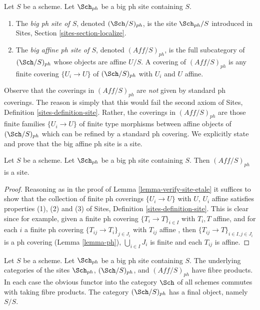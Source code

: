 \begin{definition}
\label{definition-big-small-ph}
Let $S$ be a scheme. Let $\Sch_{ph}$ be a big ph site containing $S$.
\begin{enumerate}
\item The {\it big ph site of $S$}, denoted
$(\Sch/S)_{ph}$, is the site $\Sch_{ph}/S$
introduced in Sites, Section \ref{sites-section-localize}.
\item The {\it big affine ph site of $S$}, denoted
$(\textit{Aff}/S)_{ph}$, is the full subcategory of
$(\Sch/S)_{ph}$ whose objects are affine $U/S$.
A covering of $(\textit{Aff}/S)_{ph}$ is any finite covering
$\{U_i \to U\}$ of $(\Sch/S)_{ph}$ with $U_i$ and $U$ affine.
\end{enumerate}
\end{definition}

\noindent
Observe that the coverings in $(\textit{Aff}/S)_{ph}$ are {\it not}
given by standard ph coverings. The reason is simply that this would
fail the second axiom of Sites, Definition \ref{sites-definition-site}.
Rather, the coverings in $(\textit{Aff}/S)_{ph}$ are those finite families
$\{U_i \to U\}$ of finite type morphisms between affine objects
of $(\Sch/S)_{ph}$ which can be refined by a standard ph covering.
We explicitly state and prove that the big affine ph site is a site.

\begin{lemma}
\label{lemma-verify-site-ph}
Let $S$ be a scheme. Let $\Sch_{ph}$ be a big ph
site containing $S$. Then $(\textit{Aff}/S)_{ph}$ is a site.
\end{lemma}

\begin{proof}
Reasoning as in the proof of Lemma \ref{lemma-verify-site-etale}
it suffices to show that the collection of finite ph coverings
$\{U_i \to U\}$ with $U$, $U_i$ affine satisfies properties
(1), (2) and (3) of
Sites, Definition \ref{sites-definition-site}.
This is clear since for example, given a finite ph covering
$\{T_i \to T\}_{i\in I}$ with $T_i, T$ affine, and for each
$i$ a finite ph covering $\{T_{ij} \to T_i\}_{j\in J_i}$ with $T_{ij}$
affine , then $\{T_{ij} \to T\}_{i \in I, j\in J_i}$ is a ph covering
(Lemma \ref{lemma-ph}), $\bigcup_{i\in I} J_i$ is finite and
each $T_{ij}$ is affine.
\end{proof}

\begin{lemma}
\label{lemma-fibre-products-ph}
Let $S$ be a scheme. Let $\Sch_{ph}$ be a big ph
site containing $S$. The underlying categories of the sites
$\Sch_{ph}$, $(\Sch/S)_{ph}$, and $(\textit{Aff}/S)_{ph}$ have fibre products.
In each case the obvious functor into the category $\Sch$ of
all schemes commutes with taking fibre products. The category
$(\Sch/S)_{ph}$ has a final object, namely $S/S$.
\end{lemma}

